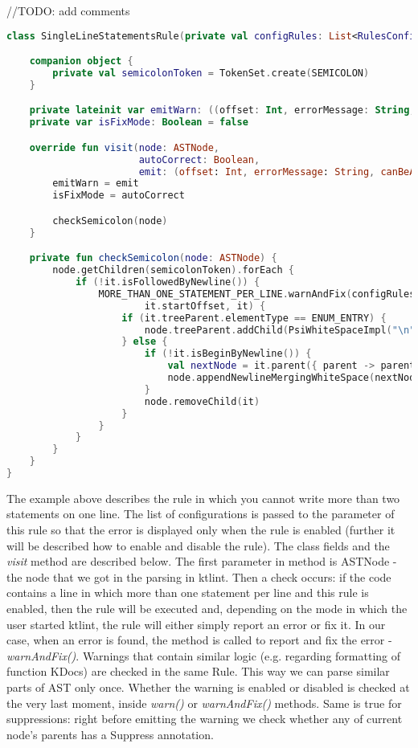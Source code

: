 //TODO: add comments
\begin{lstlisting}[caption={Example of rule.}, label={lst:example1}, language=Kotlin]
class SingleLineStatementsRule(private val configRules: List<RulesConfig>) : Rule("statement") {

    companion object {
        private val semicolonToken = TokenSet.create(SEMICOLON)
    }

    private lateinit var emitWarn: ((offset: Int, errorMessage: String, canBeAutoCorrected: Boolean) -> Unit)
    private var isFixMode: Boolean = false

    override fun visit(node: ASTNode,
                       autoCorrect: Boolean,
                       emit: (offset: Int, errorMessage: String, canBeAutoCorrected: Boolean) -> Unit) {
        emitWarn = emit
        isFixMode = autoCorrect

        checkSemicolon(node)
    }

    private fun checkSemicolon(node: ASTNode) {
        node.getChildren(semicolonToken).forEach {
            if (!it.isFollowedByNewline()) {
                MORE_THAN_ONE_STATEMENT_PER_LINE.warnAndFix(configRules, emitWarn, isFixMode, it.extractLineOfText(),
                        it.startOffset, it) {
                    if (it.treeParent.elementType == ENUM_ENTRY) {
                        node.treeParent.addChild(PsiWhiteSpaceImpl("\n"), node.treeNext)
                    } else {
                        if (!it.isBeginByNewline()) {
                            val nextNode = it.parent({ parent -> parent.treeNext != null }, strict = false)?.treeNext
                            node.appendNewlineMergingWhiteSpace(nextNode, it)
                        }
                        node.removeChild(it)
                    }
                }
            }
        }
    }
}
\end{lstlisting}

The example above describes the rule in which you cannot write more than two statements on one line. The list of configurations is passed to the parameter of this rule so that the error is displayed only when the rule is enabled (further it will be described how to enable and disable the rule). The class fields and the \textsl{visit} method are described below. The first parameter in method is ASTNode - the node that we got in the parsing in ktlint. Then a check occurs: if the code contains a line in which more than one statement per line and this rule is enabled, then the rule will be executed and, depending on the mode in which the user started ktlint, the rule will either simply report an error or fix it. In our case, when an error is found, the method is called to report and fix the error - \textsl{warnAndFix()}. Warnings that contain similar logic (e.g. regarding formatting of function KDocs) are checked in the same Rule. This way we can parse similar parts of AST only once. Whether the warning is enabled or disabled is checked at the very last moment, inside \textsl{warn()} or \textsl{warnAndFix()} methods. Same is true for suppressions: right before emitting the warning we check whether any of current node's parents has a Suppress annotation.

